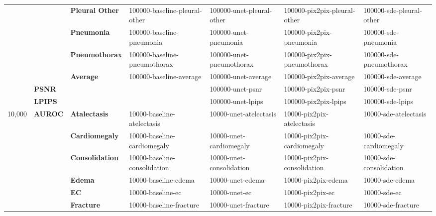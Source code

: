 \begin{table}[]
\begin{tabular}{cll|llll}
                                 &                        & \textbf{Pleural Other} & 100000-baseline-pleural-other & 100000-unet-pleural-other & 100000-pix2pix-pleural-other & 100000-sde-pleural-other \\ 
                                 &                        & \textbf{Pneumonia} & 100000-baseline-pneumonia & 100000-unet-pneumonia & 100000-pix2pix-pneumonia & 100000-sde-pneumonia \\ 
                                 &                        & \textbf{Pneumothorax} & 100000-baseline-pneumothorax & 100000-unet-pneumothorax & 100000-pix2pix-pneumothorax & 100000-sde-pneumothorax \\
                                 &                        & \textbf{Average} & 100000-baseline-average & 100000-unet-average & 100000-pix2pix-average & 100000-sde-average \\ \cline{2-3}
                                 & \multicolumn{2}{l|}{\textbf{PSNR}}            & \cellcolor[HTML]{C0C0C0} & 100000-unet-psnr & 100000-pix2pix-psnr & 100000-sde-psnr \\
                                 & \multicolumn{2}{l|}{\textbf{LPIPS}}           & \cellcolor[HTML]{C0C0C0} & 100000-unet-lpips & 100000-pix2pix-lpips & 100000-sde-lpips \\ \hline
\multirow{15}{*}{10,000}               & \multirow{13}{*}{\textbf{AUROC}} & \textbf{Atalectasis}  & 10000-baseline-atelectasis & 10000-unet-atelectasis & 10000-pix2pix-atelectasis & 10000-sde-atelectasis \\
                                 &                        & \textbf{Cardiomegaly} & 10000-baseline-cardiomegaly & 10000-unet-cardiomegaly & 10000-pix2pix-cardiomegaly & 10000-sde-cardiomegaly \\
                                 &                        & \textbf{Consolidation} & 10000-baseline-consolidation & 10000-unet-consolidation & 10000-pix2pix-consolidation & 10000-sde-consolidation \\ 
                                 &                        & \textbf{Edema} & 10000-baseline-edema & 10000-unet-edema & 10000-pix2pix-edema & 10000-sde-edema \\ 
                                 &                        & \textbf{EC} & 10000-baseline-ec & 10000-unet-ec & 10000-pix2pix-ec & 10000-sde-ec \\ 
                                 &                        & \textbf{Fracture} & 10000-baseline-fracture & 10000-unet-fracture & 10000-pix2pix-fracture & 10000-sde-fracture \\ 

\end{tabular}
\end{table}
